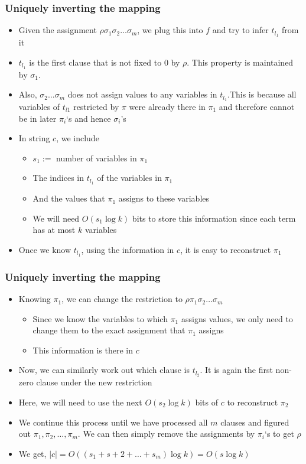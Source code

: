 \documentclass{beamer}[11pt]
\begin{document}
\begin{frame}
\frametitle{Uniquely inverting the mapping}
 \begin{itemize}
  \item Given the assignment $\rho\sigma_1\sigma_2\ldots\sigma_m$, we plug this into $f$ and try to infer $t_{l_1}$ from it
  \item $t_{l_1} $ is the first clause that is not fixed to 0 by $\rho$. This property is maintained by $\sigma_1$.
  \item Also, $\sigma_2\ldots\sigma_m$ does not assign values to any variables in $t_{l_1}$.\pause This is because all variables of $t_{l1} $ restricted by  $\pi$ were already there in $\pi_1$ and therefore cannot be in later $\pi_i$`s and hence $\sigma_i$'s
  \pause\item In string $c$, we include 
  \begin{itemize}
   \item $s_1:=$ number of variables in $\pi_1$
   \item The indices in $t_{l_1}$ of the variables in $\pi_1$
   \item And the values that $\pi_1$ assigns to these variables
   \item We will need $O(s_1\log k) $ bits to store this information since each term has at most $k$ variables
  \end{itemize}
 \item Once we know $t_{l_1} $, using the information in $c$, it is easy to reconstruct $\pi_1$
 \end{itemize}
\end{frame}
\begin{frame}
 \frametitle{Uniquely inverting the mapping}
 \begin{itemize}
  \item Knowing $\pi_1$, we can change the restriction to $\rho\pi_1\sigma_2\ldots\sigma_m$
  \begin{itemize}
   \pause\item Since we know the variables to which $\pi_1$ assigns values, we only need to change them to the exact assignment that $\pi_1$ assigns
   \item This information is there in $c$
  \end{itemize}
 \pause\item Now, we can similarly work out which clause is $t_{l_2}$. It is again the first non-zero clause under the new restriction
 \item Here, we will need to use the next $O(s_2\log k) $ bits of $c$ to reconstruct $\pi_2$
 \item We continue this process until we have processed all $m$ clauses and figured out $\pi_1,\pi_2,\ldots,\pi_m$. We can then simply remove the assignments by $\pi_i$`s to get $\rho$
 \item We get, $|c|=O((s_1+s+2+\ldots +s_m)\log k) = O(s\log k) $
 \end{itemize}

\end{frame}
\end{document}
